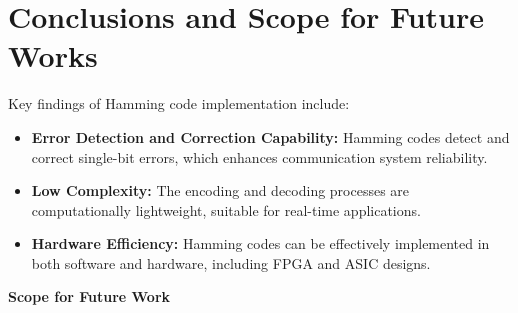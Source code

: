 \documentclass{article}
\begin{document}
    
     
\section{Conclusions and Scope for Future Works}
Key findings of Hamming code implementation include:
\begin{itemize}
    \item \textbf{Error Detection and Correction Capability:} Hamming codes detect and correct single-bit errors, which enhances communication system reliability.
    \item \textbf{Low Complexity:} The encoding and decoding processes are computationally lightweight, suitable for real-time applications.
    \item \textbf{Hardware Efficiency:} Hamming codes can be effectively implemented in both software and hardware, including FPGA and ASIC designs.
\end{itemize}


 




\textbf{Scope for Future Work}
\end{document}
